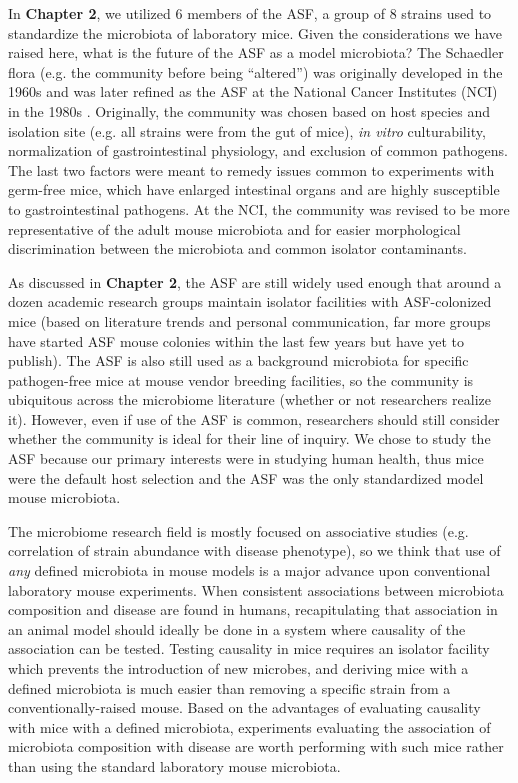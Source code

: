 \documentclass[11pt,twocolumn,notitlepage,openany,twoside]{book}
\begin{document}
\begin{refsection}
In \textbf{Chapter 2}, we utilized 6 members of the ASF, a group of 8 strains used to standardize the microbiota of laboratory mice. Given the considerations we have raised here, what is the future of the ASF as a model microbiota? The Schaedler flora (e.g. the community before being “altered”) was originally developed in the 1960s \cite{Schaedler1965-tg} and was later refined as the ASF at the National Cancer Institutes (NCI) in the 1980s \cite{Wymore_Brand2015-ez}. Originally, the community was chosen based on host species and isolation site (e.g. all strains were from the gut of mice), \textit{in vitro} culturability, normalization of gastrointestinal physiology, and exclusion of common pathogens. The last two factors were meant to remedy issues common to experiments with germ-free mice, which have enlarged intestinal organs and are highly susceptible to gastrointestinal pathogens. At the NCI, the community was revised to be more representative of the adult mouse microbiota and for easier morphological discrimination between the microbiota and common isolator contaminants.

As discussed in \textbf{Chapter 2}, the ASF are still widely used enough that around a dozen academic research groups maintain isolator facilities with ASF-colonized mice (based on literature trends and personal communication, far more groups have started ASF mouse colonies within the last few years but have yet to publish). The ASF is also still used as a background microbiota for specific pathogen-free mice at mouse vendor breeding facilities, so the community is ubiquitous across the microbiome literature (whether or not researchers realize it). However, even if use of the ASF is common, researchers should still consider whether the community is ideal for their line of inquiry. We chose to study the ASF because our primary interests were in studying human health, thus mice were the default host selection and the ASF was the only standardized model mouse microbiota.

The microbiome research field is mostly focused on associative studies (e.g. correlation of strain abundance with disease phenotype), so we think that use of \textit{any} defined microbiota in mouse models is a major advance upon conventional laboratory mouse experiments. When consistent associations between microbiota composition and disease are found in humans, recapitulating that association in an animal model should ideally be done in a system where causality of the association can be tested. Testing causality in mice requires an isolator facility which prevents the introduction of new microbes, and deriving mice with a defined microbiota is much easier than removing a specific strain from a conventionally-raised mouse. Based on the advantages of evaluating causality with mice with a defined microbiota, experiments evaluating the association of microbiota composition with disease are worth performing with such mice rather than using the standard laboratory mouse microbiota.


\end{refsection}
\end{document}
